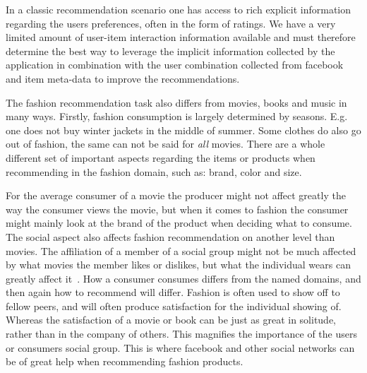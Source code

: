In a classic recommendation scenario one has access to rich explicit
information regarding the users preferences, often in the form of ratings. We
have a very limited amount of user-item interaction information available and
must therefore determine the best way to leverage the implicit information
collected by the application in combination with the user combination collected
from facebook and item meta-data to improve the recommendations.

The fashion recommendation task also differs from movies, books and music in
many ways.  Firstly, fashion consumption is largely determined by seasons.
E.g. one does not buy winter jackets in the middle of summer.  Some clothes do
also go out of fashion, the same can not be said for \emph{all} movies.  There
are a whole different set of important aspects regarding the items or products
when recommending in the fashion domain, such as: brand, color and size.

For the average consumer of a movie the producer might not affect greatly the
way the consumer views the movie, but when it comes to fashion the consumer
might mainly look at the brand of the product when deciding what to consume.
The social aspect also affects fashion recommendation on another level than
movies.
The affiliation of a member of a social group might not be much affected by
what movies the member likes or dislikes, but what the individual wears can
greatly affect it~\cite{vignali2009fashion}.
How a consumer consumes differs from the named domains, and then again how to
recommend will differ.  Fashion is often used to show off to fellow peers, and
will often produce satisfaction for the individual showing of.
Whereas the satisfaction of a movie or book can be just as great in solitude,
rather than in the company of others.  This magnifies the importance of the
users or consumers social group.  This is where facebook and other social
networks can be of great help when recommending fashion products.


